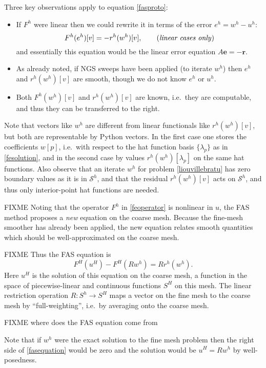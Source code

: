 \documentclass[letterpaper,final,12pt,reqno]{amsart}
\newcommand{\be}{\mathbf{e}}
\newcommand{\br}{\mathbf{r}}
\begin{document}
Three key observations apply to equation \eqref{fasproto}:
\begin{itemize}
\item If $F^h$ were linear then we could rewrite it in terms of the error $e^h=w^h-u^h$:
    $$F^h(e^h)[v] = -r^h(w^h)[v], \qquad (\text{\emph{linear cases only}})$$
and essentially this equation would be the linear error equation $A\be=-\br$.
\item As already noted, if NGS sweeps have been applied (to iterate $w^h$) then $e^h$ and $r^h(w^h)[v]$ are smooth, though we do not know $e^h$ or $u^h$.
\item Both $F^h(w^h)[v]$ and $r^h(w^h)[v]$ are known, i.e.~they are computable, and thus they can be transferred to the right.
\end{itemize}
Note that vectors like $w^h$ are different from linear functionals like $r^h(w^h)[v]$, but both are representable by Python vectors.  In the first case one stores the coefficients $w[p]$, i.e.~with respect to the hat function basis $\{\lambda_p\}$ as in \eqref{fesolution}, and in the second case by values $r^h(w^h)[\lambda_p]$ on the same hat functions.  Also observe that an iterate $w^h$ for problem \eqref{liouvillebratu} has zero boundary values as it is in $\mathcal{S}^h$, and that the residual $r^h(w^h)[v]$ acts on $\mathcal{S}^h$, and thus only interior-point hat functions are needed.

FIXME Noting that the operator $F^h$ in \eqref{feoperator} is nonlinear in $u$, the FAS method  proposes a \emph{new} equation on the coarse mesh.  Because the fine-mesh smoother has already been applied, the new equation relates smooth quantities which should be well-approximated on the coarse mesh.  

FIXME Thus the FAS equation is
\begin{equation}
  F^H(u^H) - F^H(R w^h) = R r^h(w^h). \label{fasequation}
\end{equation}
Here $u^H$ is the solution of this equation on the coarse mesh, a function in the space of piecewise-linear and continuous functions $S^H$ on this mesh.  The linear restriction operation $R:S^h \to S^H$ maps a vector on the fine mesh to the coarse mesh by ``full-weighting'', i.e.~by averaging onto the coarse mesh.

FIXME where does the FAS equation come from

Note that if $w^h$ were the exact solution to the fine mesh problem then the right side of \eqref{fasequation} would be zero and the solution would be $u^H = R w^h$ by well-posedness.
\end{document}
